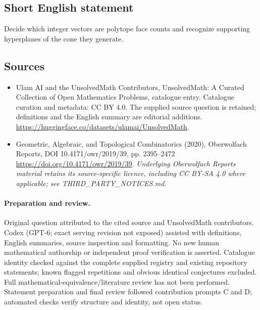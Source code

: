\documentclass[11pt]{article}
\begin{document}
\subsection{Short English statement}
Decide which integer vectors are polytope face counts and recognize supporting hyperplanes of the cone they generate.
\subsection{Sources}
\begin{itemize}
\item[\hypertarget{source:statement:1}{S1}] Ulam AI and the UnsolvedMath Contributors, UnsolvedMath: A Curated Collection of Open Mathematics Problems, catalogue entry. Catalogue curation and metadata: CC BY 4.0. The supplied source question is retained; definitions and the English summary are editorial additions.
\url{https://huggingface.co/datasets/ulamai/UnsolvedMath}.
\item[\hypertarget{source:statement:2}{S2}] Geometric, Algebraic, and Topological Combinatorics (2020), Oberwolfach Reports, DOI 10.4171/owr/2019/39, pp. 2395--2472
\url{https://doi.org/10.4171/owr/2019/39}.
\textit{Underlying Oberwolfach Reports material retains its source-specific licence, including CC BY-SA 4.0 where applicable; see THIRD\_PARTY\_NOTICES.md.}
\end{itemize}
\paragraph{Preparation and review.}
Original question attributed to the cited source and UnsolvedMath contributors. Codex (GPT-6; exact serving revision not exposed) assisted with definitions, English summaries, source inspection and formatting. No new human mathematical authorship or independent proof verification is asserted. Catalogue identity checked against the complete supplied registry and existing repository statements; known flagged repetitions and obvious identical conjectures excluded. Full mathematical-equivalence/literature review has not been performed. Statement preparation and final review followed contribution prompts C and D; automated checks verify structure and identity, not open status.
\label{end:statement}
\end{document}
